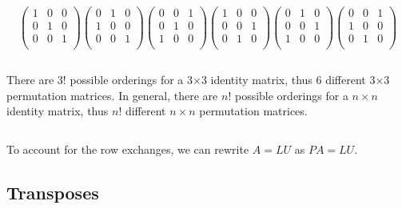 \documentclass[12pt]{article}
\begin{document}
\[
\left(
    \begin{matrix}
        1 & 0 & 0\\
        0 & 1 & 0\\
        0 & 0 & 1\\
    \end{matrix}
\right)
\left(
    \begin{matrix}
        0 & 1 & 0\\
        1 & 0 & 0\\
        0 & 0 & 1\\
    \end{matrix}
\right)
\left(
    \begin{matrix}
        0 & 0 & 1\\
        0 & 1 & 0\\
        1 & 0 & 0\\
    \end{matrix}
\right)
\left(
    \begin{matrix}
        1 & 0 & 0\\
        0 & 0 & 1\\
        0 & 1 & 0\\
    \end{matrix}
\right)
\left(
    \begin{matrix}
        0 & 1 & 0\\
        0 & 0 & 1\\
        1 & 0 & 0\\
    \end{matrix}
\right)
\left(
    \begin{matrix}
        0 & 0 & 1\\
        1 & 0 & 0\\
        0 & 1 & 0\\
    \end{matrix}
\right)
\]

$\>$

There are $3!$ possible orderings for a 3$\times$3 identity matrix, thus 6 different 3$\times$3 permutation matrices. In general, there are $n!$ possible orderings for a $n\times{n}$ identity matrix, thus $n!$ different $n\times{n}$ permutation matrices.

$\>$

To account for the row exchanges, we can rewrite $A=LU$ as $PA=LU$.

\subsection{Transposes}
\end{document}
